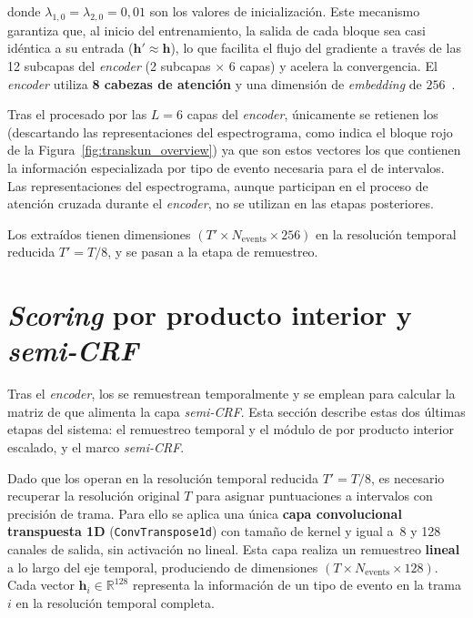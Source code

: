 \documentclass[11pt,spanish,listoffigures,listoftables]{tfgetsinf}
\begin{document}
\noindent donde $\lambda_{1,0} = \lambda_{2,0} = 0{,}01$ son los valores de
inicialización. Este mecanismo garantiza que, al inicio del entrenamiento, la
salida de cada bloque sea casi idéntica a su entrada ($\boldsymbol{h}' \approx
\boldsymbol{h}$), lo que facilita el flujo del gradiente a través de las 12
subcapas del \textit{encoder} (2 subcapas $\times$ 6 capas) y acelera la convergencia.
El \textit{encoder} utiliza \textbf{8 cabezas de atención} y una dimensión de \textit{embedding}
de $256$~\cite{yan2024transkun}.


Tras el procesado por las $L = 6$ capas del \textit{encoder}, únicamente se retienen los
 (descartando las representaciones del
espectrograma, como indica el bloque rojo de la
Figura~\ref{fig:transkun_overview}) ya que son estos vectores los que
contienen la información especializada por tipo de evento necesaria para el
 de intervalos. Las representaciones del espectrograma,
aunque participan en el proceso de atención cruzada durante el \textit{encoder}, no se
utilizan en las etapas posteriores.

Los  extraídos tienen dimensiones
$(T' \times N_{\text{events}} \times 256)$ en la resolución temporal reducida
$T' = T/8$, y se pasan a la etapa de remuestreo.


\section{\textit{Scoring} por producto interior y \textit{semi-CRF}}
\label{sec:transkun_scoring}

Tras el \textit{encoder}, los  se remuestrean temporalmente
y se emplean para calcular la matriz de  que alimenta la
capa \textit{semi-CRF}. Esta sección describe estas dos últimas etapas del sistema: el
remuestreo temporal y el módulo de  por producto interior
escalado, y el marco \textit{semi-CRF}.


Dado que los  operan en la resolución temporal
reducida $T' = T/8$, es necesario recuperar la resolución original $T$ para asignar
puntuaciones a intervalos con precisión de trama. Para ello se aplica una única
\textbf{capa convolucional transpuesta 1D} (\texttt{ConvTranspose1d}) con tamaño
de kernel y  igual a~8 y 128 canales de salida, sin
activación no lineal. Esta capa realiza un remuestreo \textbf{lineal} a lo largo del
eje temporal, produciendo  de dimensiones
$(T \times N_{\text{events}} \times 128)$. Cada vector $\boldsymbol{h}_i \in
\mathbb{R}^{128}$ representa la información de un tipo de evento en la trama $i$
en la resolución temporal completa.
\end{document}
